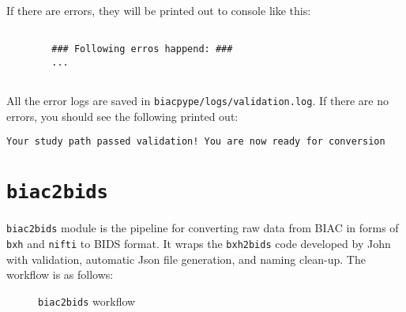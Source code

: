 \documentclass[12pt]{myland}
\def\<#1>{\texttt{#1}}
\begin{document}
    If there are errors, they will be printed out to console like this:
        \begin{lstlisting}[xleftmargin=.2\textwidth, xrightmargin=.2\textwidth]

        ### Following erros happend: ###
        ... 


        \end{lstlisting}        
   
    All the error logs are saved in \<biacpype/logs/validation.log>. If there are no errors,
    you should see the following printed out:
    \begin{center}\<Your study path passed validation! You are now ready for conversion>\end{center}



\section{\texttt{biac2bids}}

   \texttt{biac2bids} module is the pipeline for converting raw data from BIAC in forms of \texttt{bxh} and
   \texttt{nifti} to BIDS format. It wraps the \<bxh2bids> code developed by John with validation,
   automatic Json file generation, and naming clean-up. The workflow is as follows:

    \begin{figure}[h]
        \begin{mybox}
            \centering
        \end{mybox}
        \caption{\<biac2bids> workflow}
    \end{figure}

\end{document}
